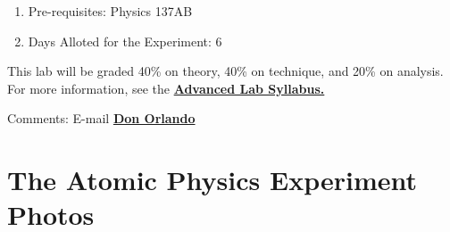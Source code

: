 \documentclass{../lab}
\begin{document}
\begin{enumerate}
    \item Pre-requisites: Physics 137AB

    \item Days Alloted for the Experiment: 6

\end{enumerate}

This lab will be graded 40\% on theory, 40\% on technique, and 20\% on analysis. For more information, see the \href{\AdvancedLabSyllabus}{\textbf{Advanced Lab Syllabus.}}

Comments: E-mail \href{\MailDonOrlando}{\textbf{Don Orlando}}

\pagebreak

\section{The Atomic Physics Experiment Photos}
\end{document}
